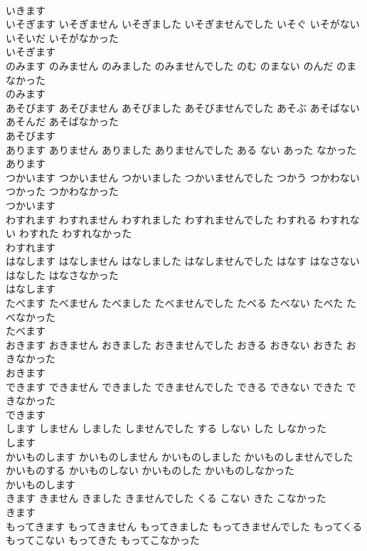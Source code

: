 \documentclass[8pt]{extreport}
\begin{document}
\begin{CJK}{UTF8}{min}
\\	いきます	
\\	いそぎます いそぎません いそぎました いそぎませんでした	いそぐ いそがない いそいだ いそがなかった	
\\	いそぎます	
\\	のみます のみません のみました のみませんでした	のむ のまない のんだ のまなかった	
\\	のみます	
\\	あそびます あそびません あそびました あそびませんでした	あそぶ あそばない あそんだ あそばなかった	
\\	あそびます	
\\	あります ありません ありました ありませんでした	ある ない あった なかった	
\\	あります	
\\	つかいます つかいません つかいました つかいませんでした	つかう つかわない つかった つかわなかった	
\\	つかいます	
\\	わすれます わすれません わすれました わすれませんでした	わすれる わすれない わすれた わすれなかった	
\\	わすれます	
\\	はなします はなしません はなしました はなしませんでした	はなす はなさない はなした はなさなかった	
\\	はなします	
\\	たべます たべません たべました たべませんでした	たべる たべない たべた たべなかった	
\\	たべます	
\\	おきます おきません おきました おきませんでした	おきる おきない おきた おきなかった	
\\	おきます	
\\	できます できません できました できませんでした	できる できない できた できなかった	
\\	できます	
\\	します しません しました しませんでした	する しない した しなかった	
\\	します	
\\	かいものします かいものしません かいものしました かいものしませんでした	かいものする かいものしない かいものした かいものしなかった	
\\	かいものします	
\\	きます きません きました きませんでした	くる こない きた こなかった	
\\	きます	
\\	もってきます もってきません もってきました もってきませんでした	もってくる もってこない もってきた もってこなかった	

\end{CJK}
\end{document}

